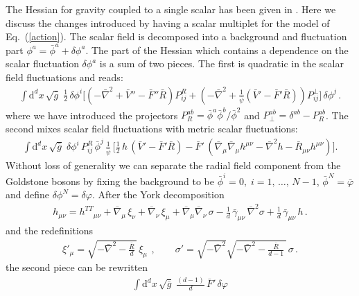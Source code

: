 \documentclass[11pt,draft]{book} %
\newcommand{\bg}{\bar \gamma}
\newcommand{\bR}{\bar R}
\newcommand{\bnabla}{\bar\nabla}
\newcommand{\tth}{{h^{TT}}}
\newcommand{\bphi}{\bar\phi}
\newcommand{\rad}{\psi}
\begin{document}
{\begin{appendices}
The Hessian for gravity coupled to a single scalar has been
given in \cite{Percacci:2015wwa}.
Here we discuss the changes introduced by having a scalar multiplet for the model of Eq.~(\ref{action}).
The scalar field is decomposed into a background and
fluctuation part $\phi^a=\bar{\phi}^a+\delta\phi^a$.
The part of the Hessian which contains a dependence
on the scalar fluctuation $\delta\phi^a$ is a sum of two pieces.
The first is quadratic in the scalar field fluctuations and reads:
\begin{align}
  \int \mathrm d^d x \, \sqrt{\bar{g}} \; \frac{1}{2} \, \delta\phi^i
  \bigg[
    \left(-\bar{\nabla}^2
    +\bar V''-\bar F''\bar{R}\right) P^{R}_{ij}
    +\left(-\bar{\nabla}^2
    +\frac{1}{\bar\rad}(\bar V'-\bar F'\bar{R})\right) P^{\perp}_{ij}
  \bigg] \, \delta\phi^j \,.
\end{align}
where we have introduced the
projectors $P_R^{ab}=\bphi^a\bphi^b/\bphi^2$
and $P_\perp^{ab} =\delta^{ab}-P_R^{ab}$.
The second mixes scalar field fluctuations with metric scalar fluctuations:
\begin{align}
  \int \mathrm d^d x \, \sqrt{\bar{g}} \;
  \delta\phi^i \, P^{R}_{ij} \, \bar{\phi}^j \,
  \frac{1}{\bar\rad} \,
  \bigg[
    \frac{1}{2} \, h \, (\bar V'-\bar F'\bR)
    - \bar F' \, (\bar \nabla_\mu\bar \nabla_\mu h^{\mu\nu} - \bar{\nabla}^2 h - \bar{R}_{\mu\nu} h^{\mu\nu})
  \bigg] .
\end{align}
Without loss of generality we can separate the radial field component from the Goldstone bosons
by fixing the background to be
$\bar{\phi}^i = 0,\; i=1,\, \dots,\, N-1$, $\bar{\phi}^N = \bar{\varphi}$
and define $\delta\phi^N = \delta \varphi$.
After the York decomposition
\begin{align}
  h_{\mu\nu} = \tth_{\!\!\mu\nu}
             + \bnabla_\mu \, \xi_\nu
             + \bnabla_\nu \, \xi_\mu
             + \bnabla_\mu \bnabla_\nu \, \sigma
             - \frac{1}{d} \, \bg_{\mu\nu} \, \bnabla^2\sigma
             + \frac{1}{d} \, \bg_{\mu\nu} \, h \,.
  \label{york}
\end{align}
and the redefinitions
\begin{align}
  \xi'_\mu = \sqrt{-\bar\nabla^2-\frac{\bar R}{d} \, } \, \xi_\mu\ \,,\qquad
  \sigma'  = \sqrt{-\bar\nabla^2}\sqrt{-\bar\nabla^2-\frac{\bar R}{d-1} \, } \, \sigma \,.
  \label{redef}
\end{align}
the second piece can be rewritten
\begin{align}
  \int \mathrm{d}^d x \, \sqrt{\bar{g}} \;
  \frac{(d-1)}{d} \, \bar F' \, \delta\varphi

\end{align}
\end{appendices}}
\end{document}
